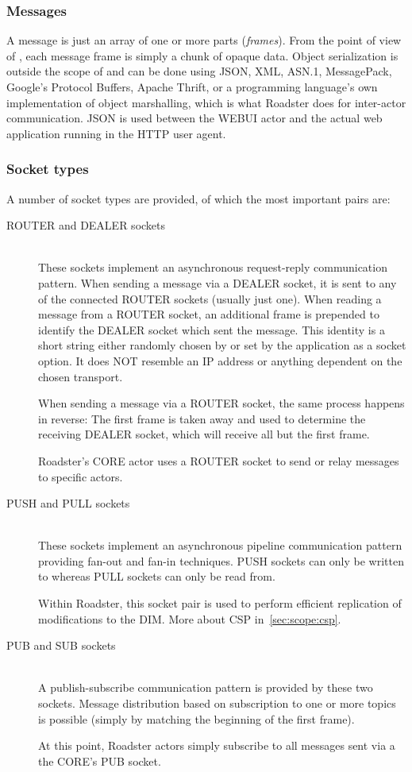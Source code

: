 \subsubsection{Messages}
A message is just an array of one or more parts (\emph{frames}). From the point
of view of \zmq, each message frame is simply a
chunk of opaque data. Object serialization is outside the scope of \zmq and can be done using
JSON, XML, ASN.1, MessagePack, Google's Protocol Buffers, Apache Thrift, or a
programming language's own implementation of object marshalling, which is what
Roadster does for inter-actor communication. JSON is used between the WEBUI
actor and the actual web application running in the HTTP user agent.

\subsubsection{Socket types}
A number of socket types are provided, of which the most important pairs are:

\begin{description}
	\item [ROUTER and DEALER sockets] \hfil\\
	These sockets implement an asynchronous request-reply communication
	pattern. When sending a message via a DEALER socket, it is sent
	to any of the connected ROUTER sockets (usually just one). When
	reading a message from a ROUTER socket, an additional frame is
	prepended to identify the DEALER socket which sent the message.
	This identity is a short string either randomly chosen by \zmq
	or set by the application as a socket option. It does NOT
	resemble an IP address or anything dependent on the chosen
	transport.

	When sending a message via a ROUTER socket, the same
	process happens in reverse: The first frame is taken away and
	used to determine the receiving DEALER socket, which will
	receive all but the first frame.

	Roadster's CORE actor uses a ROUTER socket to send or relay
	messages to specific actors.


	\item [PUSH and PULL sockets] \hfil\\
	These sockets implement an asynchronous pipeline communication pattern
	providing fan-out and fan-in techniques. PUSH sockets can only be
	written to whereas PULL sockets can only be read from.


	Within Roadster, this socket pair is used to perform efficient
	replication of modifications to the DIM. More about CSP
	in~\autoref{sec:scope:csp}.


	\item [PUB and SUB sockets] \hfil\\
	A publish-subscribe communication pattern is provided by these two
	sockets. Message distribution based on subscription to one or
	more topics is possible (simply by matching the beginning of the first
	frame).

	At this point, Roadster actors simply
	subscribe to all messages sent via a the CORE's PUB socket.

\end{description}

